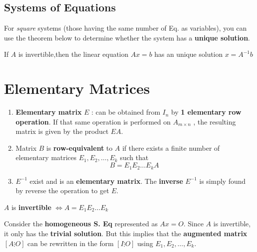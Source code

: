 \documentclass{article}
\newcommand\B{\textbf}
\newcommand\x{\times}
\begin{document}
    \subsection*{Systems of Equations}
    For \textit{square} systems (those having the same number of Eq. as variables), you can use the 
    theorem below to determine whether the system has a \B{unique solution}.
    
    \begin{tcolorbox}[width=\textwidth,colback={blue9}]    
        If $A$ is invertible,then the linear equation $Ax = b$ has an unique solution
        $x = A^{-1}b$
    \end{tcolorbox}   

    \section{Elementary Matrices}


    \begin{tcolorbox}[width=\textwidth,colback={blue9}]    
        \begin{enumerate}
            \item \B{Elementary matrix} $E$ : can be obtained from $I_n$ by \B{1 elementary row operation}.
        If that same operation is performed on $A_{m \x n}$ , the resulting matrix is given
        by the product $EA$.
        \item Matrix $B$ is \B{row-equivalent} to $A$ if there exists a finite number of elementary
        matrices $E_1, E_2, \dots, E_k$ such that 
        \[ B = E_1E_2\dots E_k A\]
        \item $E^{-1}$ exist and is an \B{elementary matrix}. The \B{inverse} $E^{-1}$ is simply found by
            reverse the operation to get $E$.
        \end{enumerate}
        \end{tcolorbox}   

    \begin{center}
    \begin{tcolorbox}[hbox,    %
           lifted shadow={1mm}{-2mm}{3mm}{0.1mm}%
           {black!50!white}]
           $A$ is \B{invertible} $\Leftrightarrow A = E_1E_2\dots E_k$
    \end{tcolorbox}
    \end{center}
    Consider the \B{homogeneous S. Eq} represented as $Ax = O$. Since $A$ is invertible, it 
    only has the \B{trivial solution}. But this implies that the \B{augmented matrix} 
    $[A \vdots O]$ can be rewritten in the form $[I \vdots O]$  using $E_1, E_2, \dots, E_k$.
        
\end{document}
